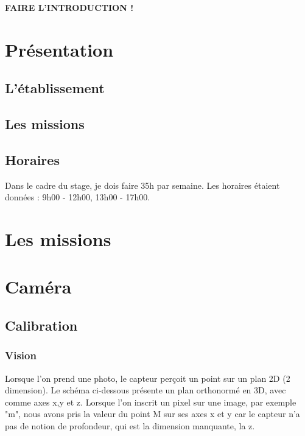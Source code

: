 \documentclass[12pt, french]{report}
\begin{document}
       \textbf{FAIRE L'INTRODUCTION !}

\newpage
\section*{Présentation}
\subsection*{L'établissement}
\subsection*{Les missions}
\subsection*{Horaires}
Dans le cadre du stage, je dois faire 35h par semaine. Les horaires étaient données :
9h00 - 12h00, 13h00 - 17h00.

\newpage

\section{Les missions}
\newpage




\section{Caméra}
\subsection{Calibration}
\subsubsection{Vision}
Lorsque l'on prend une photo, le capteur perçoit un point sur un plan 2D (2 dimension). Le schéma ci-dessous présente un plan orthonormé en 3D, avec comme axes x,y et z. Lorsque l'on inscrit un pixel sur une image, par exemple "m", nous avons pris la valeur du point M sur ses axes x et y car le capteur n'a pas de notion de profondeur, qui est la dimension manquante, la z.

\begin{center}
\end{center}
\end{document}
